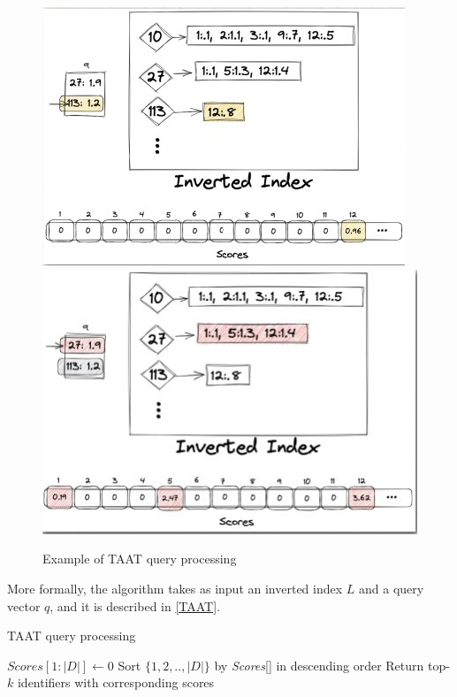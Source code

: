 \begin{figure}[h!]
		\centering
		\includegraphics[scale = 1.8]{img/taat.jpg}
        \includegraphics[scale = 1.8]{img/taat 2.jpg}
        \label{taat}
        \caption{Example of TAAT query processing}
\end{figure}

More formally, the algorithm takes as input an inverted index $L$ and a query vector $q$, and it is described in \ref{TAAT}.


\begin{algorithm}[]
\caption{TAAT query processing}\label{TAAT}
$\textit{Scores}[1:|D|] \gets 0$\;
Sort $\{ 1, 2, .., |D| \}$ by \textit{Scores}[] in descending order\;
Return top-$k$ identifiers with corresponding scores\;
\end{algorithm}

